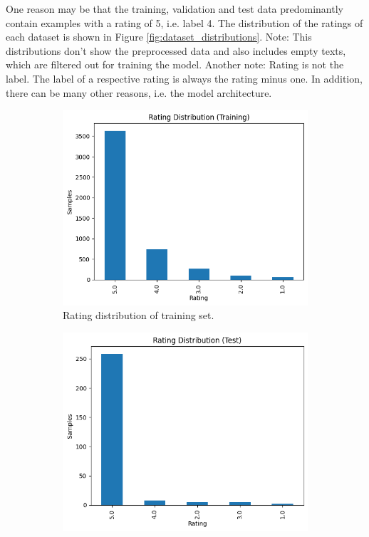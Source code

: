 \documentclass[a4 paper]{article}
\numberwithin{equation}{section}
\newcommand{\0}{\mathbf{0}}
\begin{document}
One reason may be that the training, validation and test data predominantly contain examples with a rating of 5, i.e. label 4. The distribution of the ratings of each dataset is shown in Figure \ref{fig:dataset_distributions}. Note: This distributions don't show the preprocessed data and also includes empty texts, which are filtered out for training the model. Another note: Rating is not the label. The label of a respective rating is always the rating minus one. In addition, there can be many other reasons, i.e. the model architecture.

\begin{center}
    \begin{figure}[H]
        \centering
        \begin{subfigure}[b]{0.49\textwidth}
            \includegraphics[width=\textwidth]{dist_training}
            \caption{Rating distribution of training set.}
            \label{fig:dist_training}
        \end{subfigure}
        \hfill
        \begin{subfigure}[b]{0.49\textwidth}
            \includegraphics[width=\textwidth]{dist_test}

\end{subfigure}
\end{figure}
\end{center}
\end{document}

